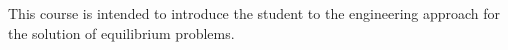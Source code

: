 {This course is intended to introduce the student to the engineering approach for the solution of equilibrium problems.}

